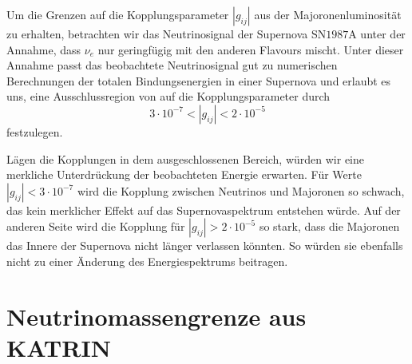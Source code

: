 Um die Grenzen auf die Kopplungsparameter $|g_{i j}|$ aus der Majoronenluminosität zu erhalten, betrachten wir das Neutrinosignal der Supernova SN$1987$A unter der Annahme, dass $\nu_e$ nur geringfügig mit den anderen Flavours mischt.
Unter dieser Annahme passt das beobachtete Neutrinosignal gut zu numerischen Berechnungen der totalen Bindungsenergien in einer Supernova und erlaubt es uns, eine Ausschlussregion von auf die Kopplungsparameter durch
\begin{equation}
    3 \cdot 10^{-7} < |g_{i j}| < 2 \cdot 10^{-5} %
    \label{eq:gijlimit}
\end{equation}
festzulegen.

Lägen die Kopplungen in dem ausgeschlossenen Bereich, würden wir eine merkliche Unterdrückung der beobachteten Energie erwarten.
Für Werte $|g_{i j}| < 3 \cdot 10^{-7}$ wird die Kopplung zwischen Neutrinos und Majoronen so schwach, das kein merklicher Effekt auf das Supernovaspektrum entstehen würde. %
Auf der anderen Seite wird die Kopplung für $|g_{i j}| > 2 \cdot 10^{-5}$ so stark, dass die Majoronen das Innere der Supernova nicht länger verlassen könnten. %
So würden sie ebenfalls nicht zu einer Änderung des Energiespektrums beitragen.


\section{Neutrinomassengrenze aus KATRIN}
\label{subsec:KATRIN}

